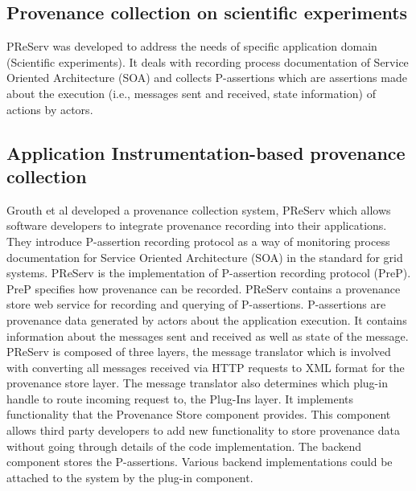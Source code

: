 \subsection{Provenance collection on scientific experiments}
\par PReServ was developed to address the needs of specific application domain (Scientific experiments). It deals with recording process documentation of Service Oriented Architecture (SOA) and collects P-assertions which are assertions made about the execution (i.e., messages sent and received, state information) of actions by actors. 


\subsection{Application Instrumentation-based provenance collection}
Grouth et al \cite{groth} developed a provenance collection system, PReServ which allows software developers to integrate provenance recording into their applications. They introduce P-assertion recording protocol as a way of monitoring process  documentation for Service Oriented Architecture (SOA) in the standard for grid systems. PReServ is the implementation of P-assertion recording protocol (PreP). PreP specifies how provenance can be recorded. PReServ contains a provenance store web service for recording and querying of P-assertions. P-assertions are provenance data generated by actors about the application execution. It contains information about the messages sent and received as well as state of the message. PReServ is composed of three layers, the message translator which is involved with converting all messages received via HTTP requests to XML format for the provenance store layer. The message translator also determines which plug-in handle to route incoming request to, the  Plug-Ins layer. It implements functionality that the Provenance Store component provides. This component allows third party developers to add new functionality to store provenance data without going through details of the code implementation. The backend component stores the P-assertions. Various backend implementations could be attached to the system by the plug-in component.

